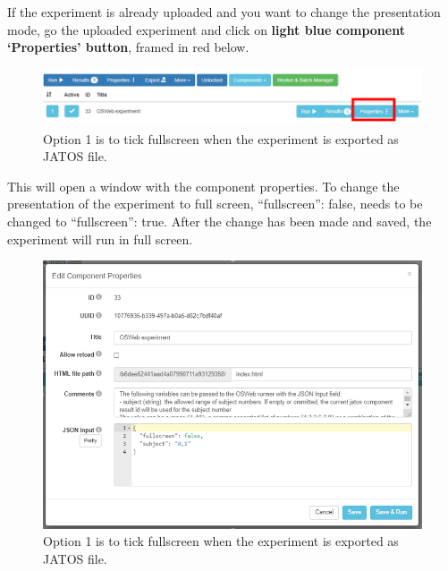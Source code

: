 \documentclass[
]{book}
\begin{document}
If the experiment is already uploaded and you want to change the presentation mode, go the uploaded experiment and click on \textbf{light blue component `Properties' button}, framed in red below.

\begin{figure}

{\centering \includegraphics[width=0.99\linewidth]{images/opensesame/componentproperty} 

}

\caption{Option 1 is to tick fullscreen when the experiment is exported as JATOS file.}\label{fig:Figure13-2}
\end{figure}

This will open a window with the component properties. To change the presentation of the experiment to full screen, ``fullscreen'': false, needs to be changed to ``fullscreen'': true. After the change has been made and saved, the experiment will run in full screen.

\begin{figure}

{\centering \includegraphics[width=0.99\linewidth]{images/opensesame/fullscreen2} 

}

\caption{Option 1 is to tick fullscreen when the experiment is exported as JATOS file.}\label{fig:Figure13-3}
\end{figure}
\end{document}
